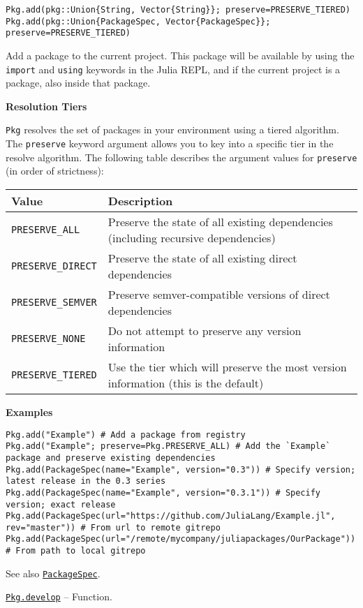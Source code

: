 \begin{adjustwidth}{2em}{0pt}


\begin{verbatim}
Pkg.add(pkg::Union{String, Vector{String}}; preserve=PRESERVE_TIERED)
Pkg.add(pkg::Union{PackageSpec, Vector{PackageSpec}}; preserve=PRESERVE_TIERED)
\end{verbatim}

Add a package to the current project. This package will be available by using the \texttt{import} and \texttt{using} keywords in the Julia REPL, and if the current project is a package, also inside that package.

\textbf{Resolution Tiers}

\texttt{Pkg} resolves the set of packages in your environment using a tiered algorithm. The \texttt{preserve} keyword argument allows you to key into a specific tier in the resolve algorithm. The following table describes the argument values for \texttt{preserve} (in order of strictness):


\begin{table}[h]

\begin{tabulary}{\linewidth}{|L|L|}
\hline
Value & Description \\
\hline
\texttt{PRESERVE\_ALL} & Preserve the state of all existing dependencies (including recursive dependencies) \\
\hline
\texttt{PRESERVE\_DIRECT} & Preserve the state of all existing direct dependencies \\
\hline
\texttt{PRESERVE\_SEMVER} & Preserve semver-compatible versions of direct dependencies \\
\hline
\texttt{PRESERVE\_NONE} & Do not attempt to preserve any version information \\
\hline
\texttt{PRESERVE\_TIERED} & Use the tier which will preserve the most version information (this is the default) \\
\hline
\end{tabulary}

\end{table}

\textbf{Examples}


\begin{verbatim}
Pkg.add("Example") # Add a package from registry
Pkg.add("Example"; preserve=Pkg.PRESERVE_ALL) # Add the `Example` package and preserve existing dependencies
Pkg.add(PackageSpec(name="Example", version="0.3")) # Specify version; latest release in the 0.3 series
Pkg.add(PackageSpec(name="Example", version="0.3.1")) # Specify version; exact release
Pkg.add(PackageSpec(url="https://github.com/JuliaLang/Example.jl", rev="master")) # From url to remote gitrepo
Pkg.add(PackageSpec(url="/remote/mycompany/juliapackages/OurPackage")) # From path to local gitrepo
\end{verbatim}

See also \hyperlink{7769325907319883786}{\texttt{PackageSpec}}.



\end{adjustwidth}
\hypertarget{9095967362638559586}{} 
\hyperlink{9095967362638559586}{\texttt{Pkg.develop}}  -- {Function.}

